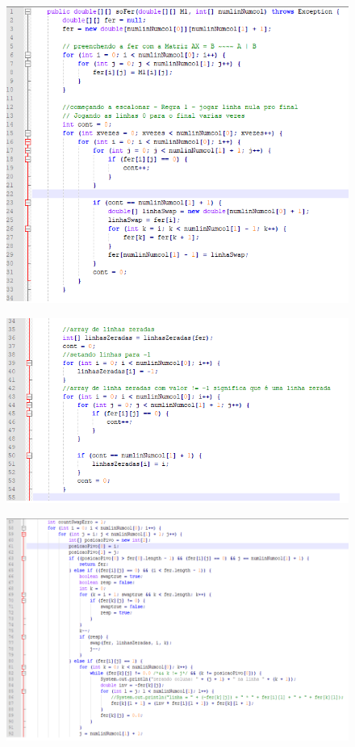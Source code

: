 \documentclass[
	12pt,				%
	openright,			%
	oneside,			%
	a4paper,			%
	english,			%
	french,				%
	spanish,			%
	brazil				%
	]{abntex2}
\begin{document}
\begin{figure}[!h]
\centering
  \includegraphics[width=0.95\linewidth]{fer1.png}
\end{figure}

\begin{figure}[!h]
\centering
  \includegraphics[width=0.95\linewidth]{fer4.png}
\end{figure}

\begin{figure}[!h]
\centering
  \includegraphics[width=0.83\linewidth]{fer3.png}
\end{figure}
\end{document}
